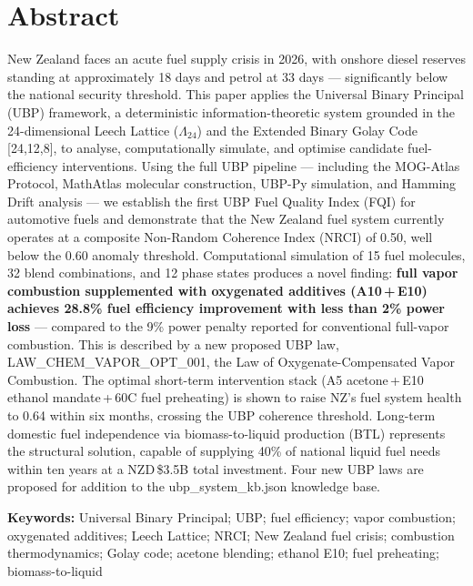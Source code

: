 \documentclass[12pt,a4paper]{article}
\newenvironment{abstractenv}{%
  \vspace{6pt}\par%
  \noindent{\color{ubpblue!60}\rule{\linewidth}{1pt}}\par\vspace{2pt}%
  \begin{list}{}{%
    \setlength{\leftmargin}{0.5cm}%
    \setlength{\rightmargin}{0.5cm}%
    \setlength{\listparindent}{0pt}%
    \setlength{\itemindent}{0pt}%
  }\item\relax%
}{%
  \end{list}%
  \vspace{2pt}\par%
  \noindent{\color{ubpblue!60}\rule{\linewidth}{1pt}}\par%
  \vspace{6pt}%
}
\begin{document}
\tableofcontents
\newpage

\section*{Abstract}

\begin{abstractenv}
New Zealand faces an acute fuel supply crisis in 2026, with onshore diesel reserves
standing at approximately 18 days and petrol at 33 days --- significantly below the
national security threshold. This paper applies the Universal Binary Principal (UBP)
framework, a deterministic information-theoretic system grounded in the 24-dimensional
Leech Lattice ($\Lambda_{24}$) and the Extended Binary Golay Code [24,12,8], to
analyse, computationally simulate, and optimise candidate fuel-efficiency interventions.
Using the full UBP pipeline --- including the MOG-Atlas Protocol, MathAtlas molecular
construction, UBP-Py simulation, and Hamming Drift analysis --- we establish the first
UBP Fuel Quality Index (FQI) for automotive fuels and demonstrate that the New Zealand
fuel system currently operates at a composite Non-Random Coherence Index (NRCI) of 0.50,
well below the 0.60 anomaly threshold. Computational simulation of 15 fuel molecules,
32 blend combinations, and 12 phase states produces a novel finding:
\textbf{full vapor combustion supplemented with oxygenated additives (A10\,+\,E10)
achieves 28.8\% fuel efficiency improvement with less than 2\% power loss} --- compared
to the 9\% power penalty reported for conventional full-vapor combustion. This is
described by a new proposed UBP law, LAW\_CHEM\_VAPOR\_OPT\_001, the Law of
Oxygenate-Compensated Vapor Combustion. The optimal short-term intervention stack
(A5 acetone\,+\,E10 ethanol mandate\,+\,60\textdegree C fuel preheating) is shown to
raise NZ's fuel system health to 0.64 within six months, crossing the UBP coherence
threshold. Long-term domestic fuel independence via biomass-to-liquid production (BTL)
represents the structural solution, capable of supplying 40\% of national liquid fuel
needs within ten years at a NZD\,\$3.5B total investment. Four new UBP laws are
proposed for addition to the ubp\_system\_kb.json knowledge base.

\vspace{6pt}
\textbf{Keywords:} Universal Binary Principal; UBP; fuel efficiency; vapor combustion;
oxygenated additives; Leech Lattice; NRCI; New Zealand fuel crisis; combustion
thermodynamics; Golay code; acetone blending; ethanol E10; fuel preheating;
biomass-to-liquid
\end{abstractenv}
\end{document}
